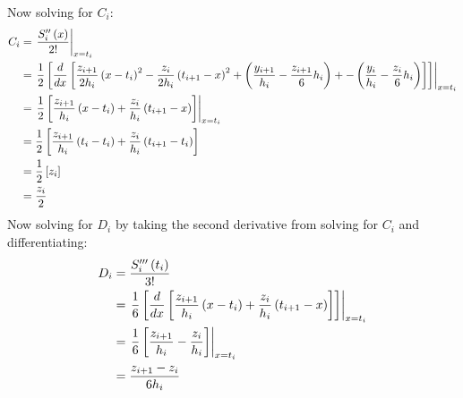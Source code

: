 \documentclass[letterpaper, 10pt, titlepage]{article}
\newcommand{\pp}{\paren}
\newcommand{\bb}{\brackets}
\newcommand{\primed}[1]{^{
    \ifthenelse
    {
        \equal{#1}{0}
    }
    {
    }
    {
        \foreach \x in {1,...,#1}{\prime}}
    }
}
\newcommand{\fs}[3]{\functionof{S_{#1}\primed{#2}}{#3}}
\begin{document}
Now solving for $C_i$:
\begin{equation}
    \begin{aligned}
        C_i &= \left.\dfrac{\fs{i}{2}{x}}{2!}\right|_{x=t_i}
        \\
        &=
        \left.\dfrac{1}{2}\bb{
            \dfrac{d}{dx}\bb{
            \dfrac{z_{i+1}}{2h_i}\pp{x - t_i}^2
            - \dfrac{z_{i}}{2h_i}\pp{t_{i+1} - x}^2
            + \pp{
                \dfrac{y_{i+1}}{h_i}
                - \dfrac{z_{i+1}}{6}h_i
                }
            + -\pp{\dfrac{y_i}{h_i}
            - \dfrac{z_{i}}{6}h_i}
            }
        }
        \right|_{x=t_i}
        \\
        &=
        \left.
        \dfrac{1}{2}\bb{
            \dfrac{z_{i+1}}{h_i}\pp{x - t_i}
            + \dfrac{z_{i}}{h_i}\pp{t_{i+1} - x}
        }
        \right|_{x=t_i}
        \\
        &=
        \dfrac{1}{2}\bb{
            \dfrac{z_{i+1}}{h_i}\pp{t_i - t_i}
            + \dfrac{z_{i}}{h_i}\pp{t_{i+1} - t_i}
        }
        \\
        &=
        \dfrac{1}{2}\bb{
            z_{i}
        }
        \\
        &=
        \dfrac{z_i}{2}
    \end{aligned}
\end{equation}
Now solving for $D_i$ by taking the second derivative from solving for $C_i$ and
differentiating:
\begin{equation}
    \begin{aligned}
        D_i &= \dfrac{\fs{i}{3}{t_i}}{3!}
        \\
        &=
        \left.
        \dfrac{1}{6}\bb{
            \dfrac{d}{dx}\bb{
                \dfrac{z_{i+1}}{h_i}\pp{x - t_i}
                + \dfrac{z_{i}}{h_i}\pp{t_{i+1} - x}
            }
        }
        \right|_{x=t_i}
        \\
        &=
        \left.
        \dfrac{1}{6}\bb{
                \dfrac{z_{i+1}}{h_i}
                - \dfrac{z_{i}}{h_i}
        }
        \right|_{x=t_i}
        \\
        &= \dfrac{z_{i+1} - z_i}{6h_i}
    \end{aligned}
\end{equation}
\end{document}
